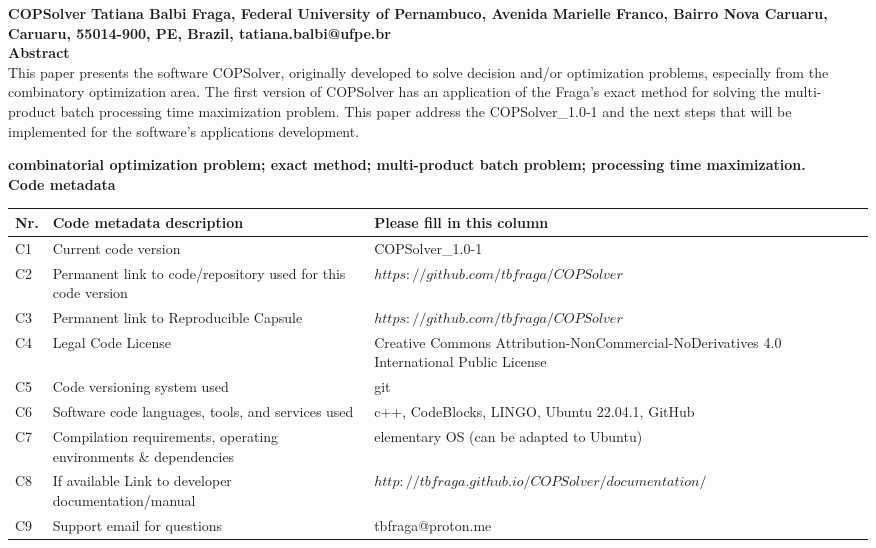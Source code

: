 \documentclass[11pt, letterpaper]{article}
\begin{document}
\noindent
\textbf{COPSolver}
\vskip0.5cm
\noindent
\textbf{Tatiana Balbi Fraga, Federal University of Pernambuco, Avenida Marielle
Franco, Bairro Nova Caruaru, Caruaru, 55014-900, PE, Brazil, tatiana.balbi@ufpe.br}\\

\noindent
\textbf{Abstract}\\
This paper presents the software COPSolver, originally developed to solve decision and/or optimization problems, especially from the combinatory optimization area. The first version of COPSolver has an application of the Fraga's exact method for solving the multi-product batch processing time maximization problem. This paper address the COPSolver\_1.0-1 and the next steps that will be implemented for the software's applications development.
\vskip0.5cm

\noindent
\textbf{combinatorial optimization problem; exact method; multi-product batch problem; processing time maximization.}\\
\vskip0.5cm
\newpage
\noindent
\textbf{Code metadata}\\

\noindent
\begin{tabular}{|l|p{6.5cm}|p{9.5cm}|}
\hline
\textbf{Nr.} & \textbf{Code metadata description} & \textbf{Please fill in this column} \\
\hline
C1 & Current code version & COPSolver\_1.0-1 \\
\hline
C2 & Permanent link to code/repository used for this code version & \underline{$https://github.com/tbfraga/COPSolver$} \\
\hline
C3  & Permanent link to Reproducible Capsule & \underline{$https://github.com/tbfraga/COPSolver$}\\
\hline
C4 & Legal Code License   & Creative Commons Attribution-NonCommercial-NoDerivatives 4.0 International Public License \\
\hline
C5 & Code versioning system used & git \\
\hline
C6 & Software code languages, tools, and services used & c++, CodeBlocks, LINGO, Ubuntu 22.04.1, GitHub\\
\hline
C7 & Compilation requirements, operating environments \& dependencies & elementary OS (can be adapted to Ubuntu) \\
\hline
C8 & If available Link to developer documentation/manual & \underline{$http://tbfraga.github.io/COPSolver/documentation/$} \\
\hline
C9 & Support email for questions & tbfraga@proton.me\\
\hline
\end{tabular}\\
\vskip0.5cm
\noindent
\end{document}
